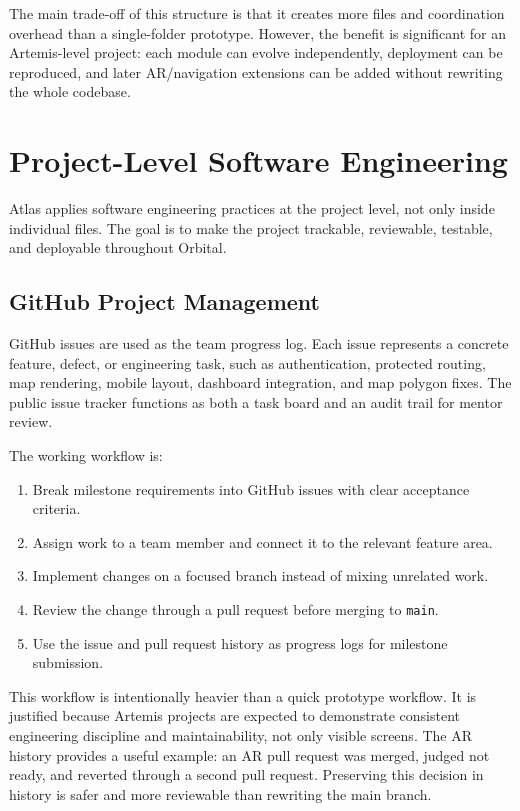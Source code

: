 \documentclass[11pt]{article}
\begin{document}
The main trade-off of this structure is that it creates more files and coordination overhead than a single-folder prototype. However, the benefit is significant for an Artemis-level project: each module can evolve independently, deployment can be reproduced, and later AR/navigation extensions can be added without rewriting the whole codebase.

\section*{Project-Level Software Engineering}

Atlas applies software engineering practices at the project level, not only inside individual files. The goal is to make the project trackable, reviewable, testable, and deployable throughout Orbital.

\subsection*{GitHub Project Management}

GitHub issues are used as the team progress log. Each issue represents a concrete feature, defect, or engineering task, such as authentication, protected routing, map rendering, mobile layout, dashboard integration, and map polygon fixes. The public issue tracker functions as both a task board and an audit trail for mentor review.

The working workflow is:

\begin{enumerate}[leftmargin=*]
    \item Break milestone requirements into GitHub issues with clear acceptance criteria.
    \item Assign work to a team member and connect it to the relevant feature area.
    \item Implement changes on a focused branch instead of mixing unrelated work.
    \item Review the change through a pull request before merging to \texttt{main}.
    \item Use the issue and pull request history as progress logs for milestone submission.
\end{enumerate}

This workflow is intentionally heavier than a quick prototype workflow. It is justified because Artemis projects are expected to demonstrate consistent engineering discipline and maintainability, not only visible screens. The AR history provides a useful example: an AR pull request was merged, judged not ready, and reverted through a second pull request. Preserving this decision in history is safer and more reviewable than rewriting the main branch.
\end{document}
